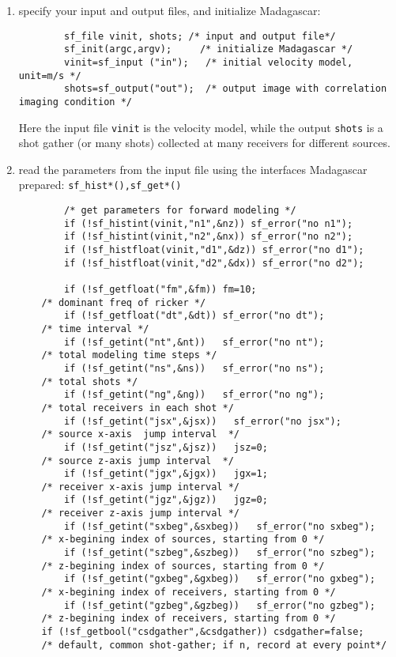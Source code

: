 \begin{enumerate}
 
 \item specify your input and output files, and initialize Madagascar: \\
 \begin{verbatim}
    	sf_file vinit, shots; /* input and output file*/    
    	sf_init(argc,argv);    	/* initialize Madagascar */
    	vinit=sf_input ("in");   /* initial velocity model, unit=m/s */
    	shots=sf_output("out");  /* output image with correlation imaging condition */ 
 \end{verbatim}
Here the input file \texttt{vinit} is the velocity model, while the output \texttt{shots} is a shot gather (or many shots) collected at many receivers for different sources.
 \item read the parameters from the input file  using the interfaces Madagascar prepared: \texttt{sf\_hist*(),sf\_get*()}
 \begin{verbatim}  
    	/* get parameters for forward modeling */
    	if (!sf_histint(vinit,"n1",&nz)) sf_error("no n1");
    	if (!sf_histint(vinit,"n2",&nx)) sf_error("no n2");
    	if (!sf_histfloat(vinit,"d1",&dz)) sf_error("no d1");
    	if (!sf_histfloat(vinit,"d2",&dx)) sf_error("no d2");
    	
    	if (!sf_getfloat("fm",&fm)) fm=10;	
	/* dominant freq of ricker */
    	if (!sf_getfloat("dt",&dt)) sf_error("no dt");	
	/* time interval */
    	if (!sf_getint("nt",&nt))   sf_error("no nt");	
	/* total modeling time steps */
    	if (!sf_getint("ns",&ns))   sf_error("no ns");	
	/* total shots */
    	if (!sf_getint("ng",&ng))   sf_error("no ng");	
	/* total receivers in each shot */	
    	if (!sf_getint("jsx",&jsx))   sf_error("no jsx");
	/* source x-axis  jump interval  */
    	if (!sf_getint("jsz",&jsz))   jsz=0;
	/* source z-axis jump interval  */
    	if (!sf_getint("jgx",&jgx))   jgx=1;
	/* receiver x-axis jump interval */
    	if (!sf_getint("jgz",&jgz))   jgz=0;
	/* receiver z-axis jump interval */
    	if (!sf_getint("sxbeg",&sxbeg))   sf_error("no sxbeg");
	/* x-begining index of sources, starting from 0 */
    	if (!sf_getint("szbeg",&szbeg))   sf_error("no szbeg");
	/* z-begining index of sources, starting from 0 */
    	if (!sf_getint("gxbeg",&gxbeg))   sf_error("no gxbeg");
	/* x-begining index of receivers, starting from 0 */
    	if (!sf_getint("gzbeg",&gzbeg))   sf_error("no gzbeg");
	/* z-begining index of receivers, starting from 0 */
	if (!sf_getbool("csdgather",&csdgather)) csdgather=false;
	/* default, common shot-gather; if n, record at every point*/
 \end{verbatim}
 

\end{enumerate}
